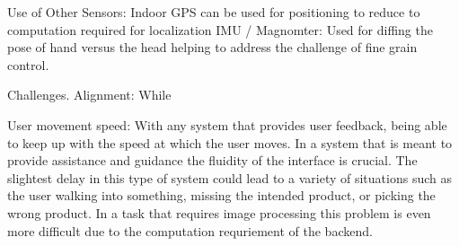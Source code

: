 Use of Other Sensors:
    Indoor GPS
        can be used for positioning to reduce to computation required for localization
    IMU / Magnomter:
        Used for diffing the pose of hand versus the head helping to address the challenge of fine grain control.


Challenges.
    Alignment:
        While 

    User movement speed:
        With any system that provides user feedback, being able to keep up with the speed at which the user moves. In a system that is meant to provide assistance and guidance the fluidity of the interface is crucial. The slightest delay in this type of system could lead to a variety of situations such as the user walking into something, missing the intended product, or picking the wrong product. In a task that requires image processing this problem is even more difficult due to the computation requriement of the backend.



